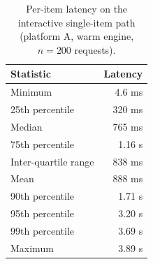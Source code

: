 \begin{table}[htb]
\centering
\caption{Per-item latency on the interactive single-item path (platform A, warm engine, $n = 200$ requests).}
\label{tab:latency}
\footnotesize
\begin{tabular}{l r}
\hline
Statistic & Latency \\
\hline
Minimum & 4.6 ms \\
25th percentile & 320 ms \\
Median & 765 ms \\
75th percentile & 1.16 s \\
Inter-quartile range & 838 ms \\
Mean & 888 ms \\
90th percentile & 1.71 s \\
95th percentile & 3.20 s \\
99th percentile & 3.69 s \\
Maximum & 3.89 s \\
\hline
\end{tabular}
\end{table}
